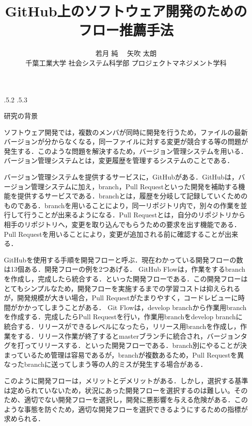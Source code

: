 \documentclass[uplatex,twocolumn]{jsarticle}
\title{\vspace{-14mm}GitHub上のソフトウェア開発のためのフロー推薦手法 \footnotemark[0]}
\author{若月 純 \footnotemark[2]　矢吹 太朗 \\ 千葉工業大学 社会システム科学部 プロジェクトマネジメント学科\footnotemark[2]}
\date{}%
\makeatletter
\renewcommand{\section}{%
    \if@slide\clearpage\fi
    \@startsection{section}{1}{\z@}%
    {\Cvs \@plus.5\Cdp \@minus.2\Cdp}%
    {.5\Cvs \@plus.3\Cdp}%
    {\normalfont\raggedright}}
\makeatother
\begin{document}
\twocolumn[
	\maketitle
]
\begingroup
\def\thefootnote{\fnsymbol{footnote}}
\endgroup

\section{研究の背景}

ソフトウェア開発では，複数のメンバが同時に開発を行うため，ファイルの最新バージョンが分からなくなる，同一ファイルに対する変更が競合する等の問題が発生する．このような問題を解決するため，バージョン管理システムを用いる．バージョン管理システムとは，変更履歴を管理するシステムのことである\cite{ikeda2014}．

バージョン管理システムを提供するサービスに，GitHubがある．GitHubは，バージョン管理システムに加え，branch，Pull Requestといった開発を補助する機能を提供するサービスである．branchとは，履歴を分岐して記録していくためのものである．branchを用いることにより，同一リポジトリ内で，別々の作業を並行して行うことが出来るようになる．Pull Requestとは，自分のリポジトリから相手のリポジトリへ，変更を取り込んでもらうための要求を出す機能である．Pull Requestを用いることにより，変更が追加される前に確認することが出来る．

GitHubを使用する手順を開発フローと呼ぶ．現在わかっている開発フローの数は13個ある\cite{onodera2015}．開発フローの例を2つあげる．
GitHub Flowは，作業をするbranchを作成し，完成したら統合する．といった開発フローである．この開発フローはとてもシンプルなため，開発フローを実施するまでの学習コストは抑えられるが，開発規模が大きい場合，Pull Requestがたまりやすく，コードレビューに時間がかかってしまうことがある．
Git Flowは，develop branchから作業用branchを作成する．完成したらPull Requestを行い，作業用branchをdevelop branchに統合する．リリースができるレベルになったら，リリース用branchを作成し，作業をする．リリース作業が終了するとmasterブランチに統合され，バージョンタグを打ってリリースする．といった開発フローである．branch別にやることが決まっているため管理は容易であるが，branchが複数あるため，Pull Requestを異なったbranchに送ってしまう等の人的ミスが発生する場合がある\cite{ohtsuka2014}．

このように開発フローは，メリットとデメリットがある．しかし，選択する基準は定められていないため，状況にあった開発フローを選択するのは難しい。そのため、適切でない開発フローを選択し，開発に悪影響を与える危険がある．このような事態を防ぐため，適切な開発フローを選択できるようにするための指標が求められる．
\end{document}
